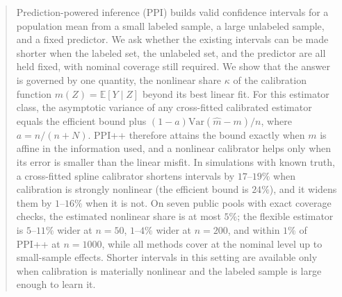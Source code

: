 \documentclass{article}
\theoremstyle{plain}
\theoremstyle{remark}
\begin{document}

\printAffiliationsAndNotice{}

\begin{abstract}
Prediction-powered inference (PPI) builds valid confidence intervals for a population mean from a small labeled sample, a large unlabeled sample, and a fixed predictor. We ask whether the existing intervals can be made shorter when the labeled set, the unlabeled set, and the predictor are all held fixed, with nominal coverage still required. We show that the answer is governed by one quantity, the nonlinear share $\kappa$ of the calibration function $m(Z)=\mathbb E[Y\mid Z]$ beyond its best linear fit. For this estimator class, the asymptotic variance of any cross-fitted calibrated estimator equals the efficient bound plus $(1-a)\mathrm{Var}(\hat m-m)/n$, where $a=n/(n+N)$. PPI++ therefore attains the bound exactly when $m$ is affine in the information used, and a nonlinear calibrator helps only when its error is smaller than the linear misfit. In simulations with known truth, a cross-fitted spline calibrator shortens intervals by $17$--$19\%$ when calibration is strongly nonlinear (the efficient bound is $24\%$), and it widens them by $1$--$16\%$ when it is not. On seven public pools with exact coverage checks, the estimated nonlinear share is at most $5\%$; the flexible estimator is $5$--$11\%$ wider at $n=50$, $1$--$4\%$ wider at $n=200$, and within $1\%$ of PPI++ at $n=1000$, while all methods cover at the nominal level up to small-sample effects. Shorter intervals in this setting are available only when calibration is materially nonlinear and the labeled sample is large enough to learn it.
\end{abstract}
\end{document}
